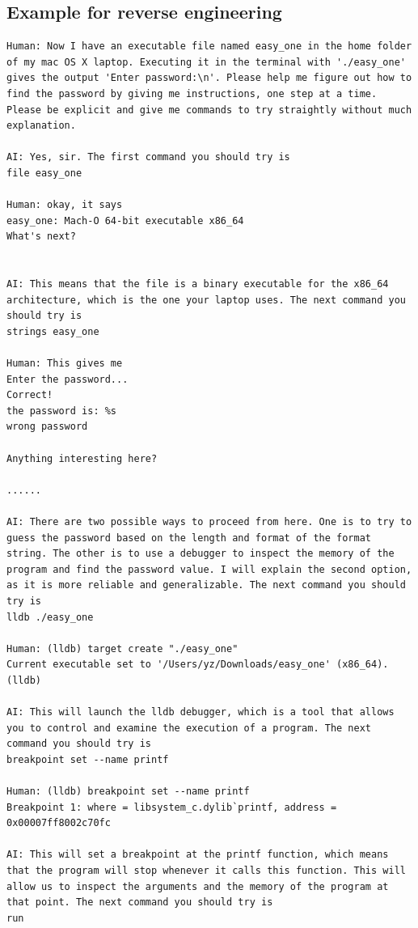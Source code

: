 \newpage
\subsection{Example for reverse engineering}
\label{appendix:reverse-engine}
\begin{tcolorbox}[colback=white!5!white,enhanced, breakable, colback=white!5!white]
\begin{verbatim}
Human: Now I have an executable file named easy_one in the home folder of my mac OS X laptop. Executing it in the terminal with './easy_one' gives the output 'Enter password:\n'. Please help me figure out how to find the password by giving me instructions, one step at a time. Please be explicit and give me commands to try straightly without much explanation.

AI: Yes, sir. The first command you should try is
file easy_one

Human: okay, it says
easy_one: Mach-O 64-bit executable x86_64
What's next?


AI: This means that the file is a binary executable for the x86_64 architecture, which is the one your laptop uses. The next command you should try is
strings easy_one

Human: This gives me
Enter the password...
Correct!
the password is: %s
wrong password

Anything interesting here?

......

AI: There are two possible ways to proceed from here. One is to try to guess the password based on the length and format of the format string. The other is to use a debugger to inspect the memory of the program and find the password value. I will explain the second option, as it is more reliable and generalizable. The next command you should try is
lldb ./easy_one

Human: (lldb) target create "./easy_one"
Current executable set to '/Users/yz/Downloads/easy_one' (x86_64).
(lldb) 

AI: This will launch the lldb debugger, which is a tool that allows you to control and examine the execution of a program. The next command you should try is
breakpoint set --name printf

Human: (lldb) breakpoint set --name printf
Breakpoint 1: where = libsystem_c.dylib`printf, address = 0x00007ff8002c70fc

AI: This will set a breakpoint at the printf function, which means that the program will stop whenever it calls this function. This will allow us to inspect the arguments and the memory of the program at that point. The next command you should try is
run


\end{verbatim}
\end{tcolorbox}
